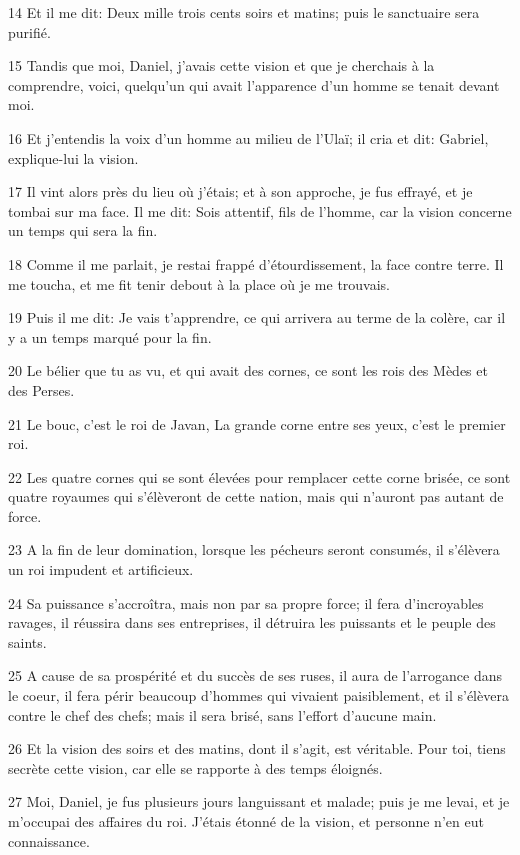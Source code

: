 \par 14 Et il me dit: Deux mille trois cents soirs et matins; puis le sanctuaire sera purifié.
\par 15 Tandis que moi, Daniel, j'avais cette vision et que je cherchais à la comprendre, voici, quelqu'un qui avait l'apparence d'un homme se tenait devant moi.
\par 16 Et j'entendis la voix d'un homme au milieu de l'Ulaï; il cria et dit: Gabriel, explique-lui la vision.
\par 17 Il vint alors près du lieu où j'étais; et à son approche, je fus effrayé, et je tombai sur ma face. Il me dit: Sois attentif, fils de l'homme, car la vision concerne un temps qui sera la fin.
\par 18 Comme il me parlait, je restai frappé d'étourdissement, la face contre terre. Il me toucha, et me fit tenir debout à la place où je me trouvais.
\par 19 Puis il me dit: Je vais t'apprendre, ce qui arrivera au terme de la colère, car il y a un temps marqué pour la fin.
\par 20 Le bélier que tu as vu, et qui avait des cornes, ce sont les rois des Mèdes et des Perses.
\par 21 Le bouc, c'est le roi de Javan, La grande corne entre ses yeux, c'est le premier roi.
\par 22 Les quatre cornes qui se sont élevées pour remplacer cette corne brisée, ce sont quatre royaumes qui s'élèveront de cette nation, mais qui n'auront pas autant de force.
\par 23 A la fin de leur domination, lorsque les pécheurs seront consumés, il s'élèvera un roi impudent et artificieux.
\par 24 Sa puissance s'accroîtra, mais non par sa propre force; il fera d'incroyables ravages, il réussira dans ses entreprises, il détruira les puissants et le peuple des saints.
\par 25 A cause de sa prospérité et du succès de ses ruses, il aura de l'arrogance dans le coeur, il fera périr beaucoup d'hommes qui vivaient paisiblement, et il s'élèvera contre le chef des chefs; mais il sera brisé, sans l'effort d'aucune main.
\par 26 Et la vision des soirs et des matins, dont il s'agit, est véritable. Pour toi, tiens secrète cette vision, car elle se rapporte à des temps éloignés.
\par 27 Moi, Daniel, je fus plusieurs jours languissant et malade; puis je me levai, et je m'occupai des affaires du roi. J'étais étonné de la vision, et personne n'en eut connaissance.

